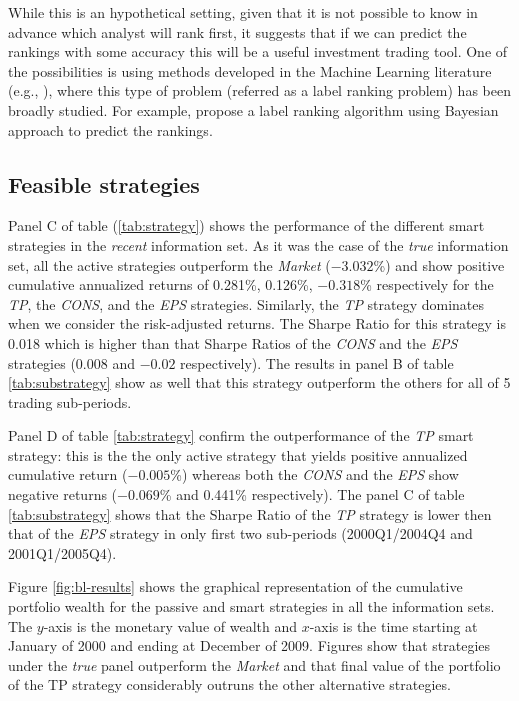 \documentclass{article}\usepackage[]{graphicx}\usepackage[]{color}
\newcommand{\tr}{\textit{true}}
\newcommand{\naive}{\textit{recent}}
\begin{document}
While this is an hypothetical setting, given that it is not possible to know in advance which analyst will rank first, it suggests that if we can predict the rankings with some accuracy this will be a useful investment trading tool. One of the possibilities is using methods developed in the Machine Learning literature (e.g., \cite{aiguzhinov2010,brazdil2003}), where this type of problem (referred as a label ranking problem) has been broadly studied. For example, \cite{aiguzhinov2010} propose a label ranking algorithm using Bayesian approach to predict the rankings.



\subsection{Feasible strategies}
Panel C of table (\ref{tab:strategy}) shows the performance of the different smart strategies in the \naive{} information set. As it was the  case of the \tr{} information set, all the active strategies outperform the \textit{Market} (\ensuremath{-3.032}\%)  and show positive cumulative annualized returns of 0.281\%,  0.126\%, \ensuremath{-0.318}\% respectively for the \textit{TP}, the \textit{CONS}, and the \textit{EPS} strategies. Similarly, the \textit{TP} strategy dominates when we consider the risk-adjusted returns. The Sharpe Ratio for this strategy is 0.018 which is higher than that Sharpe Ratios of the \textit{CONS} and  the \textit{EPS} strategies  (0.008 and \ensuremath{-0.02} respectively). The results in panel B of table \ref{tab:substrategy} show as well that this strategy outperform the others for all of 5 trading sub-periods. 

Panel D of table \ref{tab:strategy} confirm the outperformance of the \textit{TP} smart strategy: this is the the only active strategy that yields positive annualized cumulative return (\ensuremath{-0.005}\%) whereas both  the \textit{CONS} and the \textit{EPS} show negative returns (\ensuremath{-0.069}\% and 0.441\% respectively). The panel C of table \ref{tab:substrategy} shows that the Sharpe Ratio of the \textit{TP} strategy is lower then that of the \textit{EPS} strategy in only first two sub-periods (2000Q1/2004Q4 and 2001Q1/2005Q4).


Figure \ref{fig:bl-results} shows the graphical representation of the cumulative portfolio wealth for  the passive and smart strategies in all the information sets. The $y$-axis is the monetary value of wealth and $x$-axis is the time starting at January of 2000 and ending at December of 2009. Figures show that strategies under the \tr{} panel outperform the \emph{Market} and that final value  of the portfolio of the TP strategy considerably outruns the other alternative strategies.
\end{document}
